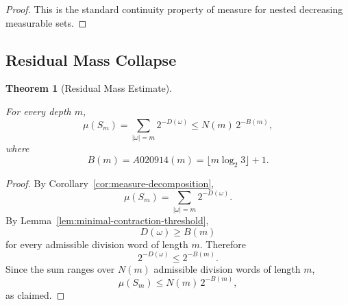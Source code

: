 \documentclass[12pt, oneside]{article}
\numberwithin{equation}{section}
\theoremstyle{definition}
\theoremstyle{plain}
\newtheorem{theorem}{Theorem}[section]
\theoremstyle{remark}
\begin{document}
\begin{proof}
This is the standard continuity property of measure for nested
decreasing measurable sets.
\end{proof}







\subsection{Residual Mass Collapse}

\begin{theorem}[Residual Mass Estimate]
\label{thm:residual-mass-estimate}

For every depth \(m\),
\[
\mu(S_m) = \sum_{|\omega|=m}2^{-D(\omega)} \le N(m)\,2^{-B(m)},
\]
where
\[
B(m)=A020914(m) = \lfloor m\log_2 3\rfloor+1.
\]
\end{theorem}

\begin{proof}
By Corollary~\ref{cor:measure-decomposition},
\[
\mu(S_m) = \sum_{|\omega|=m} 2^{-D(\omega)}.
\]
By Lemma~\ref{lem:minimal-contraction-threshold},
\[
D(\omega)\ge B(m)
\]
for every admissible division word of length \(m\). Therefore
\[
2^{-D(\omega)} \le 2^{-B(m)}.
\]
Since the sum ranges over \(N(m)\) admissible division words of length \(m\),
\[
\mu(S_m) \le N(m)\,2^{-B(m)},
\]
as claimed.
\end{proof}
\end{document}
